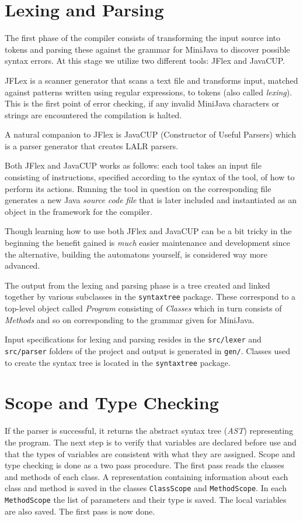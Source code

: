 \documentclass[11pt]{amsart}
\begin{document}
\section{Lexing and Parsing}
The first phase of the compiler consists of transforming the input source into tokens and parsing these against the grammar for MiniJava to discover possible syntax errors. At this stage we utilize two different tools: JFlex and JavaCUP. 

JFLex is a scanner generator that scans a text file and transforms input, matched against patterns written using regular expressions, to tokens (also called \textit{lexing}). This is the first point of error checking, if any invalid MiniJava characters or strings are encountered the compilation is halted.

A natural companion to JFlex is JavaCUP (Constructor of Useful Parsers) which is a parser generator that creates LALR parsers\cite{appel}.

Both JFlex and JavaCUP works as follows: each tool takes an input file consisting of instructions, specified according to the syntax of the tool, of how to perform its actions. Running the tool in question on the corresponding file generates a new Java \textit{source code file} that is later included and instantiated as an object in the framework for the compiler. 

Though learning how to use both JFlex and JavaCUP can be a bit tricky in the beginning the benefit gained is \textit{much} easier maintenance and development since the alternative, building the automatons\cite{automata} yourself, is considered way more advanced.

The output from the lexing and parsing phase is a tree created and linked together by various subclasses in the \texttt{syntaxtree} package. These correspond to a top-level object called \textit{Program} consisting of \textit{Classes} which in turn consists of \textit{Methods} and so on corresponding to the grammar given for MiniJava\cite{grammar}.

Input specifications for lexing and parsing resides in the \texttt{src/lexer} and \texttt{src/parser} folders of the project and output is generated in \texttt{gen/}. Classes used to create the syntax tree is located in the \texttt{syntaxtree} package.

\section{Scope and Type Checking}
	If the parser is successful, it returns the abstract syntax tree (\textit{AST}) representing the program. The next step is to verify that variables are declared before use and that the types of variables are consistent with what they are assigned. Scope and type checking is done as a two pass procedure. The first pass reads the classes and methods of each class. A representation containing information about each class and method is saved in the classes \texttt{ClassScope} and \texttt{MethodScope}. In each \texttt{MethodScope} the list of parameters and their type is saved. The local variables are also saved. The first pass is now done.
\end{document}
